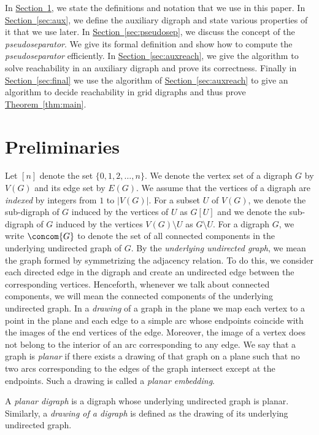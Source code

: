 \documentclass[11pt]{article}
\numberwithin{equation}{section}
\theoremstyle{definition}
\theoremstyle{plain}
\newcommand{\expref}[2]{\hyperref[#2]{#1~\ref{#2}}}
\begin{document}
In \expref{Section}{sec:prelims}, we state the definitions and
%
notation  %
that we use in this paper. In \expref{Section}{sec:aux}, we define the auxiliary 
digraph %
and state various properties of it that we use later. In \expref{Section}{sec:pseudosep}, we discuss the concept of the \emph{pseudoseparator}. We give its formal definition and show how to compute the \emph{pseudoseparator} efficiently. In \expref{Section}{sec:auxreach}, we give the algorithm to solve reachability in an auxiliary 
digraph %
and prove its correctness. Finally in \expref{Section}{sec:final} we use the algorithm of \expref{Section}{sec:auxreach} to give an algorithm to decide reachability in grid 
digraphs %
and thus prove \expref{Theorem}{thm:main}.

\section{Preliminaries}
\label{sec:prelims}
Let $[n]$ denote the set $\{0,1,2,\ldots , n\}$. %
%
We denote the vertex set of a 
digraph %
$G$ by $V(G)$ and its edge set by $E(G)$. We assume that the vertices of a 
digraph %
are \emph{indexed} by integers from $1$ to $\lvert V(G) \rvert$. For a subset $U$ of $V(G)$, we denote the %
sub-digraph %
 of $G$ induced by the vertices of $U$ as $G[U]$ and we denote the %
sub-digraph %
 of $G$ induced by the vertices $V(G)\setminus U$ as $G\setminus U$. For a 
digraph %
$G$, %
%
we write $\concom{G}$ to denote  %
the set of all connected components
in the underlying undirected graph of $G$.  %
By
the  %
\emph{underlying undirected graph}, we mean the graph formed by %
symmetrizing the adjacency %
relation.  %
To do this, we consider each directed edge in the digraph and create an undirected edge between the corresponding vertices.
%
%
%
%
Henceforth, whenever we talk about connected components, we will mean the connected components of the underlying undirected graph.
%
In a \emph{drawing} of a graph 
in the plane
we map each vertex to
a  %
point %
in  %
the plane and each edge to a simple arc whose endpoints coincide with the
%
images  %
of the end vertices of the edge.
%
%
%
%
%
Moreover, 
%
the image of a vertex does not belong to the interior of an arc corresponding to any edge. %
We say that a graph is \emph{planar} if there exists a drawing of that graph on a plane such that no two
%
arcs corresponding to the edges %
of the graph %
intersect except at the endpoints. %
Such a drawing is called a \emph{planar embedding}.%

A \emph{planar digraph} is a digraph whose underlying undirected graph is planar. Similarly, a \emph{drawing of a digraph} is defined as the drawing of its underlying undirected graph. %
\end{document}
